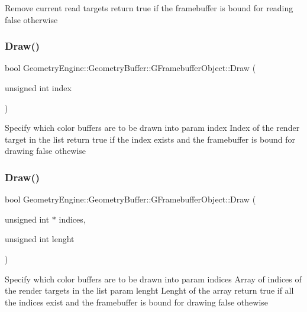 Remove current read targets return true if the framebuffer is bound for reading false otherwise \mbox{\label{class_geometry_engine_1_1_geometry_buffer_1_1_g_framebuffer_object_a7d7a7a938f5889a79701d5dd7af17ca7}} 
\subsubsection{\texorpdfstring{Draw()}{Draw()}\hspace{0.1cm}{\footnotesize\ttfamily [1/2]}}
{\footnotesize\ttfamily bool Geometry\+Engine\+::\+Geometry\+Buffer\+::\+G\+Framebuffer\+Object\+::\+Draw (\begin{DoxyParamCaption}\item[{unsigned int}]{index }\end{DoxyParamCaption})}

Specify which color buffers are to be drawn into param index Index of the render target in the list return true if the index exists and the framebuffer is bound for drawing false othewise \mbox{\label{class_geometry_engine_1_1_geometry_buffer_1_1_g_framebuffer_object_abb6147d96585c43a6c2d53fe2506a863}} 
\subsubsection{\texorpdfstring{Draw()}{Draw()}\hspace{0.1cm}{\footnotesize\ttfamily [2/2]}}
{\footnotesize\ttfamily bool Geometry\+Engine\+::\+Geometry\+Buffer\+::\+G\+Framebuffer\+Object\+::\+Draw (\begin{DoxyParamCaption}\item[{unsigned int $\ast$}]{indices,  }\item[{unsigned int}]{lenght }\end{DoxyParamCaption})}

Specify which color buffers are to be drawn into param indices Array of indices of the render targets in the list param lenght Lenght of the array return true if all the indices exist and the framebuffer is bound for drawing false othewise \mbox{\label{class_geometry_engine_1_1_geometry_buffer_1_1_g_framebuffer_object_a340d3969c1dae0c35115ffcd2ff3772a}} 
